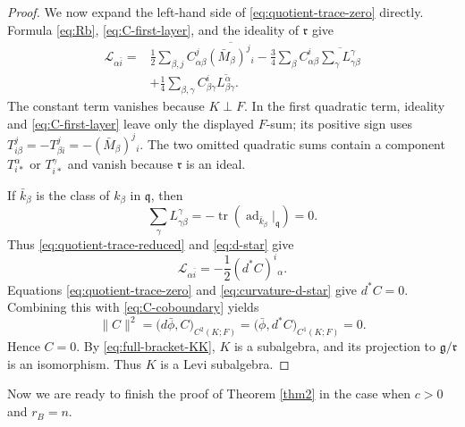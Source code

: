 \documentclass{amsart}
\begin{document}
\begin{proof}
We now expand the left-hand side of
\eqref{eq:quotient-trace-zero} directly.  Formula \eqref{eq:Rb},
\eqref{eq:C-first-layer}, and the ideality of $\mathfrak r$ give
\begin{equation}\label{eq:quotient-trace-reduced}
\begin{aligned}
 {\mathcal L}_{\alpha\bar{i}}
={}&\frac{1}{2}\sum_{\beta,j}C^j_{\alpha\beta}
       \overline{(\bar M_\beta)^j{}_{i}}
 -\frac{3}{4}\sum_\beta C^i_{\alpha\beta}
       \overline{\sum_\gamma L^\gamma_{\gamma\beta}}\\
 &+\frac{1}{4}\sum_{\beta,\gamma}C^i_{\beta\gamma}
       \overline{L^\alpha_{\beta\gamma}}.
\end{aligned}
\end{equation}
The constant term vanishes because $K\perp F$.  In the first quadratic
term, ideality and \eqref{eq:C-first-layer} leave only the displayed
$F$-sum; its positive sign uses
$T^j_{i\beta}=-T^j_{\beta i}=-(\bar M_\beta)^j{}_i$.
The two omitted quadratic sums contain a component
$T^\alpha_{i\ast}$ or $T^\gamma_{i\ast}$ and vanish because
$\mathfrak r$ is an ideal.

If $\bar k_\beta$ is the class of $k_\beta$ in $\mathfrak q$, then
\[
 \sum_\gamma L^\gamma_{\gamma\beta}
 =-\operatorname{tr}\!\left(
   \operatorname{ad}_{\bar k_\beta}\big|_{\mathfrak q}
  \right)=0.
\]
Thus \eqref{eq:quotient-trace-reduced} and \eqref{eq:d-star} give
\begin{equation}\label{eq:curvature-d-star}
 {\mathcal L}_{\alpha\bar{i}}
 =-\frac{1}{2}(d^*C)^i{}_{\alpha}.
\end{equation}
Equations \eqref{eq:quotient-trace-zero} and
\eqref{eq:curvature-d-star} give $d^*C=0$.
Combining this with \eqref{eq:C-coboundary} yields
\[
 \|C\|^2
 =\big(d\bar\phi,C\big)_{C^2(K;F)}
 =\big(\bar\phi,d^*C\big)_{C^1(K;F)}=0.
\]
Hence $C=0$.  By \eqref{eq:full-bracket-KK}, $K$ is a subalgebra, and its
projection to $\mathfrak g/\mathfrak r$ is an isomorphism.  Thus $K$ is a
Levi subalgebra.
\end{proof}

Now we are ready to finish the proof of Theorem \ref{thm2} in the case when $c>0$ and $r_B=n$.
\end{document}
